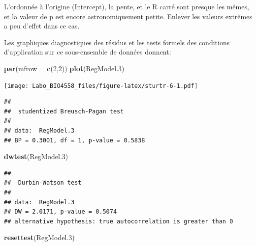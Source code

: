 \documentclass[12pt,]{book}
\newenvironment{Shaded}{\begin{snugshade}}{\end{snugshade}}
\newcommand{\DataTypeTok}[1]{\textcolor[rgb]{0.27,0.27,0.27}{#1}}
\newcommand{\DecValTok}[1]{\textcolor[rgb]{0.06,0.06,0.06}{#1}}
\newcommand{\FloatTok}[1]{\textcolor[rgb]{0.06,0.06,0.06}{#1}}
\newcommand{\KeywordTok}[1]{\textcolor[rgb]{0.27,0.27,0.27}{\textbf{#1}}}
\newcommand{\NormalTok}[1]{#1}
\newcommand{\OperatorTok}[1]{\textcolor[rgb]{0.43,0.43,0.43}{\textbf{#1}}}
\newcommand{\StringTok}[1]{\textcolor[rgb]{0.5,0.5,0.5}{#1}}
\begin{document}
L'ordonnée à l'origine (Intercept), la pente, et le R carré sont presque les mêmes, et la valeur de p est encore astronomiquement petite. Enlever les valeurs extrêmes a peu d'effet dans ce cas.

Les graphiques diagnostiques des résidus et les tests formels des conditions d'application sur ce sous-ensemble de données donnent:

\begin{Shaded}
\begin{Highlighting}[]
\KeywordTok{par}\NormalTok{(}\DataTypeTok{mfrow =} \KeywordTok{c}\NormalTok{(}\DecValTok{2}\NormalTok{,}\DecValTok{2}\NormalTok{))}
\KeywordTok{plot}\NormalTok{(RegModel}\FloatTok{.3}\NormalTok{)}
\end{Highlighting}
\end{Shaded}

\texttt{[image: Labo\_BIO4558\_files/figure-latex/sturtr-6-1.pdf]}

\begin{Shaded}
\end{Shaded}

\begin{verbatim}
## 
## 	studentized Breusch-Pagan test
## 
## data:  RegModel.3
## BP = 0.3001, df = 1, p-value = 0.5838
\end{verbatim}

\begin{Shaded}
\begin{Highlighting}[]
\KeywordTok{dwtest}\NormalTok{(RegModel}\FloatTok{.3}\NormalTok{)}
\end{Highlighting}
\end{Shaded}

\begin{verbatim}
## 
## 	Durbin-Watson test
## 
## data:  RegModel.3
## DW = 2.0171, p-value = 0.5074
## alternative hypothesis: true autocorrelation is greater than 0
\end{verbatim}

\begin{Shaded}
\begin{Highlighting}[]
\KeywordTok{resettest}\NormalTok{(RegModel}\FloatTok{.3}\NormalTok{)}
\end{Highlighting}
\end{Shaded}
\end{document}
